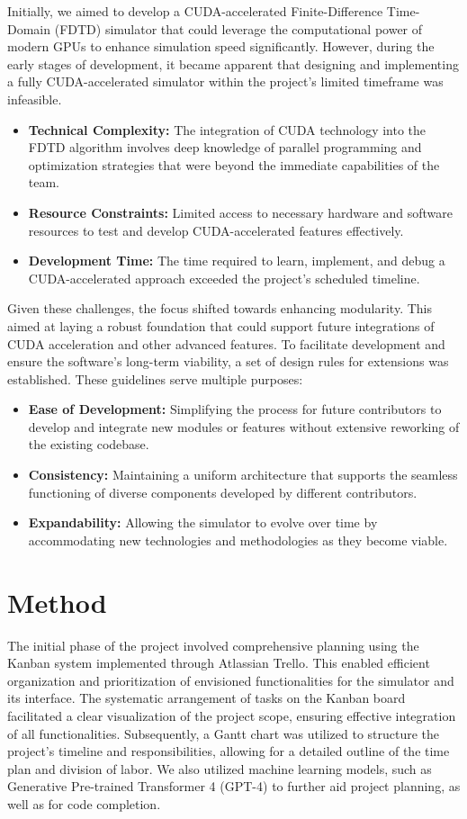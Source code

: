 \documentclass[11pt, a4paper, titlepage]{article}
\begin{document}
Initially, we aimed to develop a CUDA-accelerated Finite-Difference Time-Domain (FDTD) simulator that could leverage the computational power of modern GPUs to enhance simulation speed significantly.
However, during the early stages of development, it became apparent that designing and implementing a fully CUDA-accelerated simulator within the project's limited timeframe was infeasible.
\begin{itemize}
	\item \textbf{Technical Complexity:} The integration of CUDA technology into the FDTD algorithm involves deep knowledge of parallel programming and optimization strategies that were beyond the immediate capabilities of the team.
	\item \textbf{Resource Constraints:} Limited access to necessary hardware and software resources to test and develop CUDA-accelerated features effectively.
	\item \textbf{Development Time:} The time required to learn, implement, and debug a CUDA-accelerated approach exceeded the project's scheduled timeline.
\end{itemize}

Given these challenges, the focus shifted towards enhancing modularity. This aimed at laying a robust foundation that could support future integrations of CUDA acceleration and other advanced features.
To facilitate development and ensure the software's long-term viability, a set of design rules for extensions was established. These guidelines serve multiple purposes:
\begin{itemize}
	\item \textbf{Ease of Development:} Simplifying the process for future contributors to develop and integrate new modules or features without extensive reworking of the existing codebase.
	\item \textbf{Consistency:} Maintaining a uniform architecture that supports the seamless functioning of diverse components developed by different contributors.
	\item \textbf{Expandability:} Allowing the simulator to evolve over time by accommodating new technologies and methodologies as they become viable.
\end{itemize}


\newpage

\newpage
\section{Method}
The initial phase of the project involved comprehensive planning using the Kanban system implemented through Atlassian Trello. This enabled efficient organization and prioritization of envisioned functionalities for the simulator and its interface. The systematic arrangement of tasks on the Kanban board facilitated a clear visualization of the project scope, ensuring effective integration of all functionalities. Subsequently, a Gantt chart was utilized to structure the project's timeline and responsibilities, allowing for a detailed outline of the time plan and division of labor. We also utilized machine learning models, such as Generative Pre-trained Transformer 4 (GPT-4)\cite{openai23} to further aid project planning, as well as for code completion.
\end{document}
